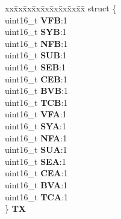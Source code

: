 \begin{DoxyCompactItemize}
\begin{tabbing}
\end{tabbing}\item 
\mbox{\label{unionuS__STSTUS_a67f92f911801db4d896076291f7a7429}} 
\begin{tabbing}
xx\=xx\=xx\=xx\=xx\=xx\=xx\=xx\=xx\=\kill
struct \{\\
\>uint16\_t {\bfseries VFB}:1\\
\>uint16\_t {\bfseries SYB}:1\\
\>uint16\_t {\bfseries NFB}:1\\
\>uint16\_t {\bfseries SUB}:1\\
\>uint16\_t {\bfseries SEB}:1\\
\>uint16\_t {\bfseries CEB}:1\\
\>uint16\_t {\bfseries BVB}:1\\
\>uint16\_t {\bfseries TCB}:1\\
\>uint16\_t {\bfseries VFA}:1\\
\>uint16\_t {\bfseries SYA}:1\\
\>uint16\_t {\bfseries NFA}:1\\
\>uint16\_t {\bfseries SUA}:1\\
\>uint16\_t {\bfseries SEA}:1\\
\>uint16\_t {\bfseries CEA}:1\\
\>uint16\_t {\bfseries BVA}:1\\
\>uint16\_t {\bfseries TCA}:1\\
\} {\bfseries TX}\\


\end{tabbing}
\end{DoxyCompactItemize}
